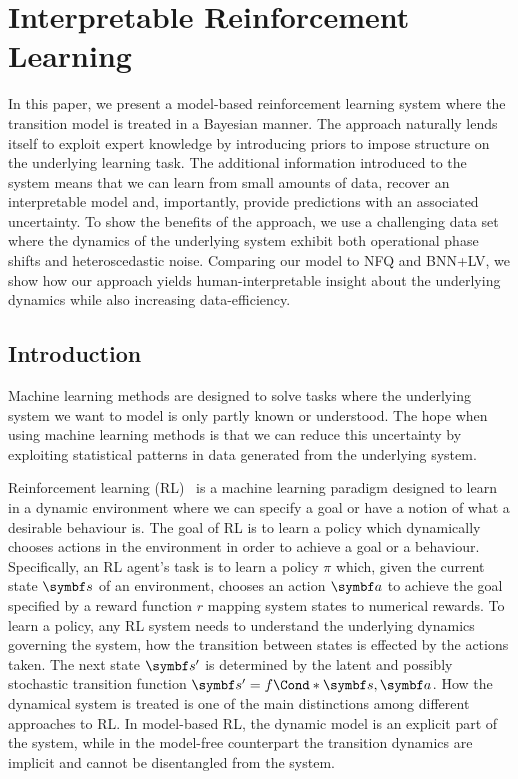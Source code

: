 \chapter{Interpretable Reinforcement Learning}
\label{toc:interpretable_rl}
In this paper, we present a model-based reinforcement learning system where the transition model is treated in a Bayesian manner.
The approach naturally lends itself to exploit expert knowledge by introducing priors to impose structure on the underlying learning task.
The additional information introduced to the system means that we can learn from small amounts of data, recover an interpretable model and, importantly, provide predictions with an associated uncertainty.
To show the benefits of the approach, we use a challenging data set where the dynamics of the underlying system exhibit both operational phase shifts and heteroscedastic noise.
Comparing our model to NFQ and BNN+LV, we show how our approach yields human-interpretable insight about the underlying dynamics while also increasing data-efficiency.


\section{Introduction}
\label{toc:interpretable_rl:introduction}
Machine learning methods \parencite{shalev-shwartz_understanding_2014} are designed to solve tasks where the underlying system we want to model is only partly known or understood.
The hope when using machine learning methods is that we can reduce this uncertainty by exploiting statistical patterns in data generated from the underlying system.

Reinforcement learning (RL)~\parencite{sutton_reinforcement_2018} is a machine learning paradigm designed to learn in a dynamic environment where we can specify a goal or have a notion of what a desirable behaviour is.
The goal of RL is to learn a policy which dynamically chooses actions in the environment in order to achieve a goal or a behaviour.
Specifically, an RL agent's task is to learn a policy $\pi$ which, given the current state $\mat{s}$ of an environment, chooses an action $\mat{a}$ to achieve the goal specified by a reward function $r$ mapping system states to numerical rewards.
To learn a policy, any RL system needs to understand the underlying dynamics governing the system, how the transition between states is effected by the actions taken.
The next state $\mat{s}^\prime$ is determined by the latent and possibly stochastic transition function $\mat{s}^\prime = \Fun*{f}{\mat{s}, \mat{a}}$.
How the dynamical system is treated is one of the main distinctions among different approaches to RL.
In model-based RL, the dynamic model is an explicit part of the system, while in the model-free counterpart the transition dynamics are implicit and cannot be disentangled from the system.

